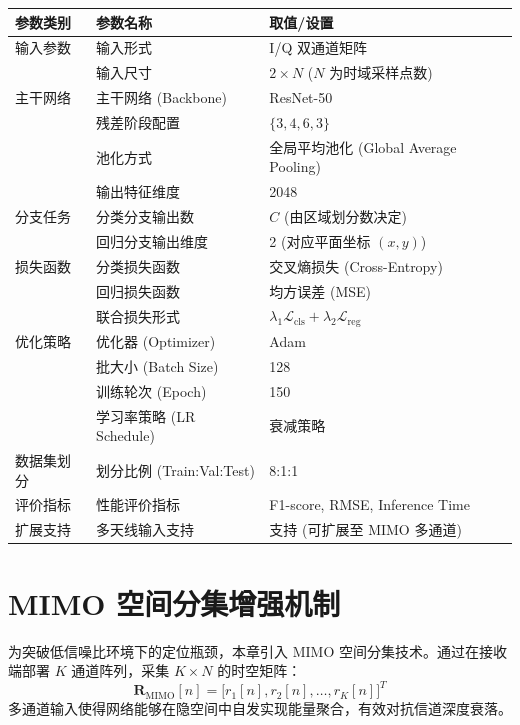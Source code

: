 \begin{table}[htbp]
    \centering
    \label{tab:resnet_params_ch3}
    \begin{tabular}{@{}lll@{}}
        \toprule
        \textbf{参数类别} & \textbf{参数名称} & \textbf{取值/设置} \\ \midrule
        输入参数 & 输入形式 & I/Q 双通道矩阵 \\
        & 输入尺寸 & $2 \times N$ ($N$ 为时域采样点数) \\
        主干网络 & 主干网络 (Backbone) & ResNet-50 \\
        & 残差阶段配置 & $\{3, 4, 6, 3\}$ \\
        & 池化方式 & 全局平均池化 (Global Average Pooling) \\
        & 输出特征维度 & 2048 \\
        分支任务 & 分类分支输出数 & $C$ (由区域划分数决定) \\
        & 回归分支输出维度 & 2 (对应平面坐标 $(x, y)$) \\
        损失函数 & 分类损失函数 & 交叉熵损失 (Cross-Entropy) \\
        & 回归损失函数 & 均方误差 (MSE) \\
        & 联合损失形式 & $\lambda_1 \mathcal{L}_{\mathrm{cls}} + \lambda_2 \mathcal{L}_{\mathrm{reg}}$ \\
        优化策略 & 优化器 (Optimizer) & Adam \\
        & 批大小 (Batch Size) & 128 \\
        & 训练轮次 (Epoch) & 150 \\
        & 学习率策略 (LR Schedule) & 衰减策略 \\
        数据集划分 & 划分比例 (Train:Val:Test) & 8:1:1 \\
        评价指标 & 性能评价指标 & F1-score, RMSE, Inference Time \\
        扩展支持 & 多天线输入支持 & 支持 (可扩展至 MIMO 多通道) \\ \bottomrule
    \end{tabular}
\end{table}

\section{MIMO 空间分集增强机制}

为突破低信噪比环境下的定位瓶颈，本章引入 MIMO 空间分集技术。通过在接收端部署 $K$ 通道阵列，采集 $K \times N$ 的时空矩阵：
\begin{equation}
\mathbf{R}_{\mathrm{MIMO}}[n] = \big[ r_1[n], r_2[n], \dots, r_K[n] \big]^T
\end{equation}
多通道输入使得网络能够在隐空间中自发实现能量聚合，有效对抗信道深度衰落。

